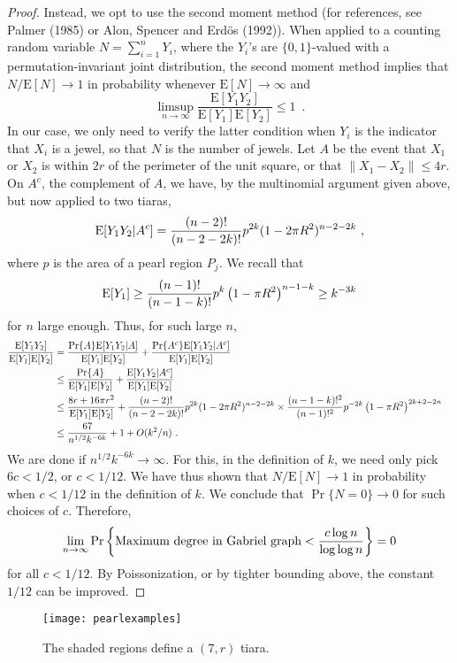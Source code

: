 \documentclass[lotsofwhite,charterfonts]{patmorin}
\newcommand{\PROB}{\Pr}
\newcommand{\EXP}{\mathrm{E}}
\begin{document}
\begin{proof}
Instead, we opt to use the second moment
method (for references, see Palmer (1985) or
Alon, Spencer and Erd\"os (1992)). When
applied to a counting random variable $N = \sum_{i=1}^n Y_i$,
where the $Y_i$'s are $\{ 0,1 \}$-valued with
a permutation-invariant joint distribution,
the second moment method implies that
$N/\EXP[N] \to 1$ in probability whenever
$\EXP[N]\to \infty$ and
\[
\limsup_{n\to\infty} \frac{\EXP[Y_1 Y_2]}{\EXP[Y_1]\EXP[Y_2]} \le 1 \enspace .
\]
In our case, we only need to verify the latter
condition when $Y_i$ is the indicator that
$X_i$ is a jewel, so that $N$ is the number of jewels.
Let $A$ be the event that $X_1$ or $X_2$ is within
$2r$ of the perimeter of the unit square, or that
$\| X_1 - X_2 \| \le 4r$.
On $A^c$, the complement of $A$, we have, by
the multinomial argument given above, but now
applied to two tiaras,
\[
\EXP[Y_1 Y_2 | A^c]
= { (n-2)! \over (n-2-2k)! } p^{2k} (1-2\pi R^2)^{n-2-2k}~,
\]
where $p$ is the area of a pearl region $P_j$.
We recall that
\[
\EXP[Y_1]\ge
{(n-1)! \over (n-1-k)!} p^k \left( 1 - \pi R^2 \right)^{n-1-k}
\ge k^{-3k}
\]
for $n$ large enough.
Thus, for such large $n$,
\[
\begin{aligned}
{\EXP[Y_1 Y_2] \over \EXP[Y_1]\EXP[Y_2]} 
&=
{\PROB\{A\}\EXP[Y_1 Y_2 |A ] \over \EXP[Y_1]\EXP[Y_2]}
+ {\PROB\{A^c\}\EXP [ Y_1 Y_2 | {A^c} ] \over \EXP[Y_1]\EXP[Y_2]} \cr
&\le
{\PROB \{ A \} \over \EXP[Y_1]\EXP[Y_2]}
+ {\EXP [ Y_1 Y_2 | A^c ] \over \EXP[Y_1]\EXP[Y_2]} \cr
&\le
{8r + 16 \pi r^2 \over \EXP[Y_1]\EXP[Y_2]}
+ { (n-2)! \over (n-2-2k)! } p^{2k} (1-2\pi R^2)^{n-2-2k}\times
{(n-1-k)!^2 \over (n-1)!^2} p^{-2k} \left( 1 - \pi R^2 \right)^{2k+2-2n} \cr
&\le
{67 \over n^{1/2} k^{-6k}} + 1 + O(k^2/n) ~. \cr
\end{aligned}
\]
We are done if $n^{1/2} k^{-6k} \to \infty$. For this,
in the definition of $k$, we need only pick
$6c < 1/2$, or $c < 1/12$.
We have thus shown that $N/\EXP[N]\to 1$ in probability
when $c < 1/12$ in the definition of $k$.
We conclude that
$\PROB \{ N = 0 \}  \to 0$ for such choices of $c$.
Therefore,
\[
\lim_{n\to\infty}
\PROB \left\{ \hbox{\rm Maximum degree in Gabriel graph}
	   < {c \log n \over \log \log n } \right\}
	   = 0
\]
for all $c < 1/12$.
By Poissonization, or by
tighter bounding above, the constant $1/12$ can be improved.
\end{proof}


\begin{figure}
\begin{center}{\texttt{[image: pearlexamples]}}\end{center}
\caption{The shaded regions define a $(7,r)$ tiara.}
\end{figure}
\end{document}
